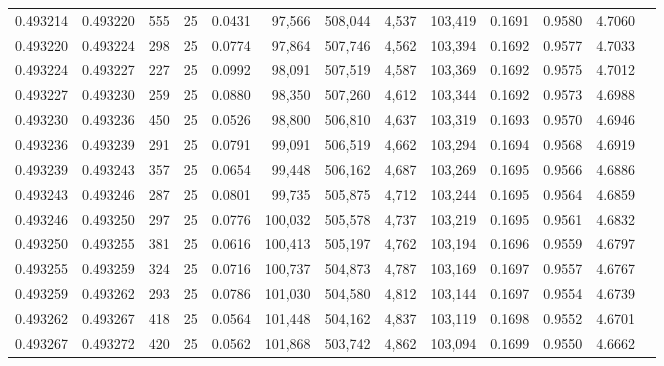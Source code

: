 \begin{tabular}{rrrrrrrrrrrrr}
0.493214 & 0.493220 &   555 &  25 &                                     0.0431 &  97,566 & 508,044 &   4,537 & 103,419 & 0.1691 & 0.9580 & 4.7060 \\
0.493220 & 0.493224 &   298 &  25 &                                     0.0774 &  97,864 & 507,746 &   4,562 & 103,394 & 0.1692 & 0.9577 & 4.7033 \\
0.493224 & 0.493227 &   227 &  25 &                                     0.0992 &  98,091 & 507,519 &   4,587 & 103,369 & 0.1692 & 0.9575 & 4.7012 \\
0.493227 & 0.493230 &   259 &  25 &                                     0.0880 &  98,350 & 507,260 &   4,612 & 103,344 & 0.1692 & 0.9573 & 4.6988 \\
0.493230 & 0.493236 &   450 &  25 &                                     0.0526 &  98,800 & 506,810 &   4,637 & 103,319 & 0.1693 & 0.9570 & 4.6946 \\
0.493236 & 0.493239 &   291 &  25 &                                     0.0791 &  99,091 & 506,519 &   4,662 & 103,294 & 0.1694 & 0.9568 & 4.6919 \\
0.493239 & 0.493243 &   357 &  25 &                                     0.0654 &  99,448 & 506,162 &   4,687 & 103,269 & 0.1695 & 0.9566 & 4.6886 \\
0.493243 & 0.493246 &   287 &  25 &                                     0.0801 &  99,735 & 505,875 &   4,712 & 103,244 & 0.1695 & 0.9564 & 4.6859 \\
0.493246 & 0.493250 &   297 &  25 &                                     0.0776 & 100,032 & 505,578 &   4,737 & 103,219 & 0.1695 & 0.9561 & 4.6832 \\
0.493250 & 0.493255 &   381 &  25 &                                     0.0616 & 100,413 & 505,197 &   4,762 & 103,194 & 0.1696 & 0.9559 & 4.6797 \\
0.493255 & 0.493259 &   324 &  25 &                                     0.0716 & 100,737 & 504,873 &   4,787 & 103,169 & 0.1697 & 0.9557 & 4.6767 \\
0.493259 & 0.493262 &   293 &  25 &                                     0.0786 & 101,030 & 504,580 &   4,812 & 103,144 & 0.1697 & 0.9554 & 4.6739 \\
0.493262 & 0.493267 &   418 &  25 &                                     0.0564 & 101,448 & 504,162 &   4,837 & 103,119 & 0.1698 & 0.9552 & 4.6701 \\
0.493267 & 0.493272 &   420 &  25 &                                     0.0562 & 101,868 & 503,742 &   4,862 & 103,094 & 0.1699 & 0.9550 & 4.6662 \\

\end{tabular}
